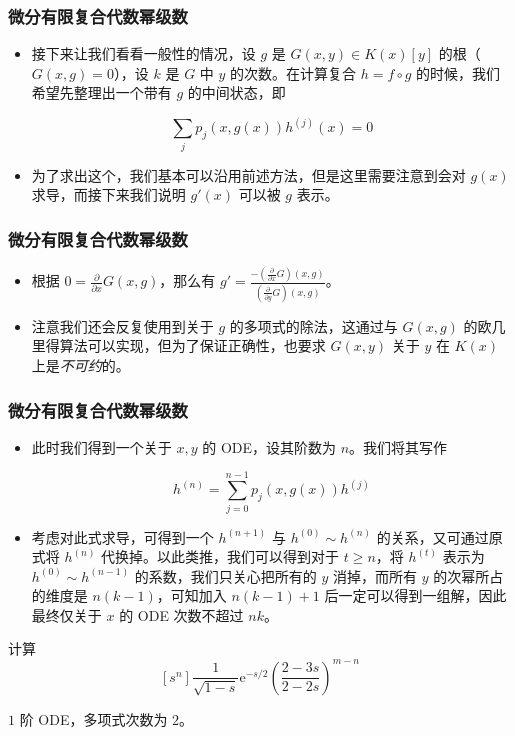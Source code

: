 \documentclass[mathserif]{ctexbeamer}
\begin{document}
\frame
{
  \frametitle{微分有限复合代数幂级数}
  
  \begin{itemize}
  \item<1-> 接下来让我们看看一般性的情况，设 $g$ 是 $G(x,y) \in K(x)[y]$ 的根（$G(x,g)=0$），设 $k$ 是 $G$ 中 $y$ 的次数。在计算复合 $h=f\circ g$ 的时候，我们希望先整理出一个带有 $g$ 的中间状态，即
  
  $$
  \sum_{j} p_j(x,g(x)) h^{(j)}(x) = 0
  $$
  
  \item<2-> 为了求出这个，我们基本可以沿用前述方法，但是这里需要注意到会对 $g(x)$ 求导，而接下来我们说明 $g'(x)$ 可以被 $g$ 表示。
  \end{itemize}
}

\frame
{
  \frametitle{微分有限复合代数幂级数}
  
  \begin{itemize}
  \item<1-> 根据 $0 = \frac{\partial}{\partial x}G(x,g)$，那么有 $g' = \frac{-(\frac{\partial}{\partial x}G)(x,g)}{(\frac{\partial}{\partial y}G)(x,g)}$。

  \item<2-> 注意我们还会反复使用到关于 $g$ 的多项式的除法，这通过与 $G(x,g)$ 的欧几里得算法可以实现，但为了保证正确性，也要求 $G(x,y)$ 关于 $y$ 在 $K(x)$ 上是\emph{不可约}的。
  \end{itemize}
}


\frame
{
  \frametitle{微分有限复合代数幂级数}
  
  \begin{itemize}
  
  \item<1-> 此时我们得到一个关于 $x,y$ 的 ODE，设其阶数为 $n$。我们将其写作
  
  $$
  h^{(n)}=\sum_{j=0}^{n-1} p_j(x,g(x)) h^{(j)}
  $$
  
  \item<2-> 考虑对此式求导，可得到一个 $h^{(n+1)}$ 与 $h^{(0)}\sim h^{(n)}$ 的关系，又可通过原式将 $h^{(n)}$ 代换掉。以此类推，我们可以得到对于 $t\ge n$，将 $h^{(t)}$ 表示为 $h^{(0)}\sim h^{(n-1)}$ 的系数，我们只关心把所有的 $y$ 消掉，而所有 $y$ 的次幂所占的维度是 $n(k-1)$，可知加入 $n(k-1)+1$ 后一定可以得到一组解，因此最终仅关于 $x$ 的 ODE 次数不超过 $nk$。
  \end{itemize}
}

\frame
{
  \begin{example}[无意识的石子堆]
  计算 $$[s^n]\frac1{\sqrt{1-s}}\mathrm{e}^{-s/2} \left(\frac{2-3s}{2-2s}\right)^{m-n}$$
  \end{example}
  
  $1$ 阶 ODE，多项式次数为 $2$。
}
\end{document}
